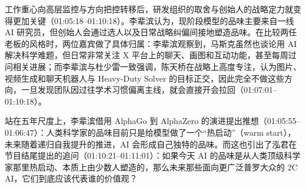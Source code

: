 \documentclass[UTF8,a4paper,11pt,fontset=fandol]{ctexart}
\begin{document}
工作重心向高层监控与方向把控转移后，研发组织的取舍与创始人的战略定力就变得更加关键（01:05:18–01:10:18）。李辈滨认为，现阶段模型的品味主要来自一线 AI 研究员，但创始人会通过选人以及日常战略纠偏间接地塑造品味。在比较两任老板的风格时，两位嘉宾做了具体归属：李辈滨观察到，马斯克虽然也谈论用 AI 解决科学难题，但日常非常关注 X 平台上的聊天、画图和互动功能，甚至每周过问相关进展；而李辈滨与杜少雷一致强调，陈天桥在战略上高度专注，认为图片、视频生成和聊天机器人与 Heavy-Duty Solver 的目标正交，因此完全不做这些方向，一旦发现团队因过往学术习惯偏离主线，就会直接开会拉回（01:07:01–01:10:18）。

站在五年尺度上，李辈滨借用 AlphaGo 到 AlphaZero 的演进提出推想（01:05:55–01:06:47）：人类科学家的品味目前只是给模型做了一个“热启动”（warm start），未来随着递归自我提升的推进，AI 会形成自己独特的品味。而这也引出了泓君在节目结尾提出的追问（01:10:21–01:11:01）：如果今天 AI 的品味是从人类顶级科学家那里热启动、本质上由少数人塑造的，那么未来那些面向更广泛普罗大众的 2C AI，它们到底应该代表谁的价值观？
\end{document}
